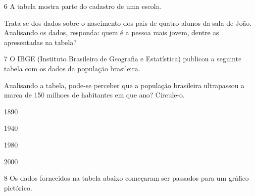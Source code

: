 \num{6} A tabela mostra parte do cadastro de uma escola.


Trata-se dos dados sobre o nascimento dos pais de quatro alunos da sala
de João. Analisando os dados, responda: quem é a pessoa mais jovem,
dentre as apresentadas na tabela?



\num{7} O IBGE (Instituto Brasileiro de Geografia e Estatística) publicou a
seguinte tabela com os dados da população brasileira.


Analisando a tabela, pode-se perceber que a população brasileira
ultrapassou a marca de 150 milhoes de habitantes em que ano? Circule-o.

\begin{escolha}
\item
  1890
\item
  1940
\item
  1980
\item
  2000
\end{escolha}


\num{8} Os dados fornecidos na tabela abaixo começaram ser passados para um
gráfico pictórico.

